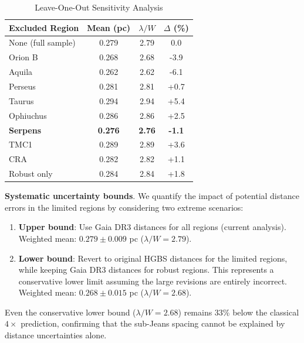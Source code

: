 \documentclass[twoside,twocolumn]{mnras}
\begin{document}
\begin{table}[h]
\caption{Leave-One-Out Sensitivity Analysis}
\label{tab:leave_one_out}
\begin{tabular}{lccc}
\toprule
Excluded Region & Mean (pc) & $\lambda/W$ & $\Delta$ (\%) \\
\midrule
None (full sample) & 0.279 & 2.79 & 0.0 \\
Orion B & 0.268 & 2.68 & -3.9 \\
Aquila & 0.262 & 2.62 & -6.1 \\
Perseus & 0.281 & 2.81 & +0.7 \\
Taurus & 0.294 & 2.94 & +5.4 \\
Ophiuchus & 0.286 & 2.86 & +2.5 \\
\textbf{Serpens} & \textbf{0.276} & \textbf{2.76} & \textbf{-1.1} \\
TMC1 & 0.289 & 2.89 & +3.6 \\
CRA & 0.282 & 2.82 & +1.1 \\
\midrule
Robust only & 0.284 & 2.84 & +1.8 \\
\bottomrule
\end{tabular}
\end{table}

\textbf{Systematic uncertainty bounds}. We quantify the impact of potential distance errors in the limited regions by considering two extreme scenarios:
\begin{enumerate}
    \item \textbf{Upper bound}: Use Gaia DR3 distances for all regions (current analysis). Weighted mean: $0.279 \pm 0.009$ pc ($\lambda/W = 2.79$).
    \item \textbf{Lower bound}: Revert to original HGBS distances for the limited regions, while keeping Gaia DR3 distances for robust regions. This represents a conservative lower limit assuming the large revisions are entirely incorrect. Weighted mean: $0.268 \pm 0.015$ pc ($\lambda/W = 2.68$).
\end{enumerate}
Even the conservative lower bound ($\lambda/W = 2.68$) remains 33\% below the classical $4\times$ prediction, confirming that the sub-Jeans spacing cannot be explained by distance uncertainties alone.
\end{document}
